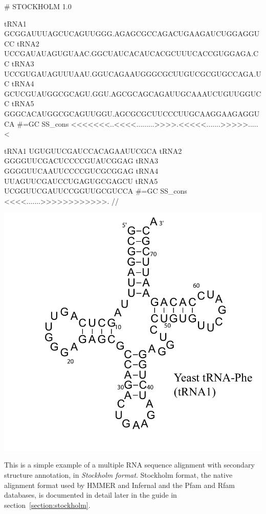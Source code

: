\vspace{1em}
\begin{minipage}{4.7in}
\begin{sreoutput}[xleftmargin=0em]
# STOCKHOLM 1.0

tRNA1             GCGGAUUUAGCUCAGUUGGG.AGAGCGCCAGACUGAAGAUCUGGAGGUCC
tRNA2             UCCGAUAUAGUGUAAC.GGCUAUCACAUCACGCUUUCACCGUGGAGA.CC
tRNA3             UCCGUGAUAGUUUAAU.GGUCAGAAUGGGCGCUUGUCGCGUGCCAGA.UC
tRNA4             GCUCGUAUGGCGCAGU.GGU.AGCGCAGCAGAUUGCAAAUCUGUUGGUCC
tRNA5             GGGCACAUGGCGCAGUUGGU.AGCGCGCUUCCCUUGCAAGGAAGAGGUCA
#=GC SS_cons      <<<<<<<..<<<<.........>>>>.<<<<<.......>>>>>.....<

tRNA1             UGUGUUCGAUCCACAGAAUUCGCA
tRNA2             GGGGUUCGACUCCCCGUAUCGGAG
tRNA3             GGGGUUCAAUUCCCCGUCGCGGAG
tRNA4             UUAGUUCGAUCCUGAGUGCGAGCU
tRNA5             UCGGUUCGAUUCCGGUUGCGUCCA
#=GC SS_cons      <<<<.......>>>>>>>>>>>>.
//
\end{sreoutput}
\end{minipage}
\begin{minipage}{1.5in}
\includegraphics[scale=0.4]{Figures/trna1-DF6280}
\end{minipage}
\vspace{1em}

This is a simple example of a multiple RNA sequence alignment with
secondary structure annotation, in \emph{Stockholm format}.  Stockholm
format, the native alignment format used by HMMER and Infernal and the
Pfam and Rfam databases, is documented in detail later in the guide in
section~\ref{section:stockholm}.

